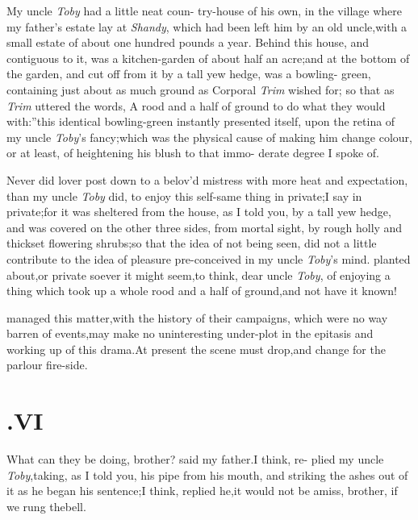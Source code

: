 \documentclass{article}
\begin{document}
My uncle \textit{Toby} had a little neat coun-\break
try-house of his own, in the village where my father’s estate lay at \textit{Shandy},
which had been left him by an old uncle,\break with a small estate of
about one hundred pounds a year. Behind this house, and contiguous
to it, was a kitchen-garden of about half an acre;\tsk and at the
bottom of the garden, and cut off from it\break
by a tall yew hedge, was a bowling-\break 
green, containing just about as much
ground as Corporal
\textit{Trim} wished for;\tsk\break
so that as \textit{Trim} uttered the
words, \lqq A rood and a half of ground to do what\break
they would with:”\tsh this identical bowling-green instantly presented
itself,  upon the retina
of my uncle \textit{Toby}’s fancy;\break\tsh which was the physical
cause of making him change colour, or at least, of heightening his
blush to that immo-\break
derate degree I spoke of.

Never did lover post down to a belov’d mistress with more heat
and expectation, than my uncle \textit{Toby} did, to enjoy this
self-same thing in private;\tsk I say in private;\tsk for it was sheltered from the house, as
I told you, by a tall yew hedge, and was covered on the other three
sides, from mortal sight, by rough holly and thickset flowering
shrubs;\tsk so that the
idea of not being seen, did not a little contribute to the
idea of pleasure pre-conceived in my uncle \textit{Toby}’s
mind.\tsk\break 
{}
planted about,\tsh or private soever it\break 
might seem,\tsk to think, dear uncle \textit{Toby}, 
of enjoying a thing which took up a\break
whole rood and a half of ground,\tsk and\break
not have it known!

 managed this
matter,\tsk with the history of their campaigns, which were no
way barren of events,\tsh may make no uninteresting
under-plot in the epitasis and working up of this drama.\tsk At
present the scene must drop,\tsk and change for the parlour
fire-side.

\bigskip
{}
\newpage
\null
\section{.\enspace  VI}

\quad\tsh What can they be doing,\break
brother? said my father.\tsk I think, re-\break
plied my uncle \textit{Toby},\tsk taking, as I told you,
his pipe from his mouth, and striking the ashes out of it as he
began his sentence;\tsh I think, replied he,\tsk it
would not be amiss, brother, if we rung the\break bell.
\end{document}
